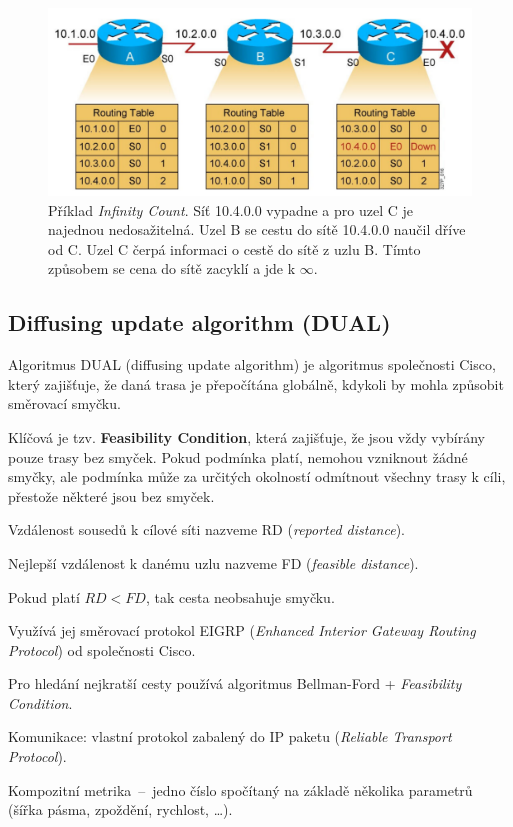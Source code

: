 \begin{figure}[H]
    \centering
    \includegraphics[width=1\linewidth]{rip_counting_infinity.pdf}
    \caption{Příklad \textit{Infinity Count}. Síť 10.4.0.0 vypadne a pro uzel C je najednou nedosažitelná. Uzel B se cestu do sítě 10.4.0.0 naučil dříve od C. Uzel C čerpá informaci o cestě do sítě z uzlu B. Tímto způsobem se cena do sítě zacyklí a jde k $\infty$.}
\end{figure}

\subsection{Diffusing update algorithm (DUAL)}

\begin{compactitem}
    \item Algoritmus DUAL (diffusing update algorithm) je algoritmus společnosti Cisco, který zajišťuje, že daná trasa je přepočítána globálně, kdykoli by mohla způsobit směrovací smyčku.
    \item Klíčová je tzv. \textbf{Feasibility Condition}, která zajišťuje, že jsou vždy vybírány pouze trasy bez smyček. Pokud podmínka platí, nemohou vzniknout žádné smyčky, ale podmínka může za určitých okolností odmítnout všechny trasy k cíli, přestože některé jsou bez smyček. \begin{compactitem}
        \item Vzdálenost sousedů k cílové síti nazveme RD (\textit{reported distance}).
        \item Nejlepší vzdálenost k danému uzlu nazveme FD (\textit{feasible distance}).
        \item Pokud platí $RD < FD$, tak cesta neobsahuje smyčku.
    \end{compactitem}
    \item Využívá jej směrovací protokol EIGRP (\textit{Enhanced Interior Gateway Routing Protocol}) od společnosti Cisco. \begin{compactitem}
        \item Pro hledání nejkratší cesty používá algoritmus Bellman-Ford + \textit{Feasibility Condition}.
        \item Komunikace: vlastní protokol zabalený do IP paketu (\textit{Reliable Transport Protocol}).
        \item Kompozitní metrika~--~jedno číslo spočítaný na základě několika parametrů (šířka pásma, zpoždění, rychlost, \dots).
    \end{compactitem}
\end{compactitem}

